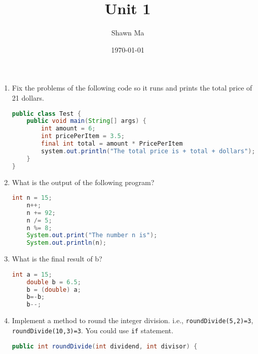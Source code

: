 \documentclass[letterpaper,12pt]{article}
\author{Shawn Ma}
\date{\today}
\title{Unit 1}
\begin{document}
\begin{enumerate}

    \item Fix the problems of the following code so it runs and prints the total 
    price of 21 dollars.
    \begin{lstlisting}[language=Java]
public class Test {
    public void main(String[] args) {
        int amount = 6;
        int pricePerItem = 3.5;
        final int total = amount * PricePerItem
        system.out.println("The total price is + total + dollars");
    }
}
    \end{lstlisting}

    \item What is the output of the following program? %
    \begin{lstlisting}[language=Java]
    int n = 15;
    n++;
    n += 92;
    n /= 5;
    n %= 8;
    System.out.print("The number n is");
    System.out.println(n);
    \end{lstlisting}

    \item What is the final result of b? %
    \begin{lstlisting}[language=Java]
    int a = 15;
    double b = 6.5;
    b = (double) a;
    b=-b;
    b--;
    \end{lstlisting}

    \item Implement a method to round the integer division. i.e., \verb|roundDivide(5,2)=3|,
     \verb|roundDivide(10,3)=3|. You could use \verb|if| statement.
    \begin{lstlisting}[language=Java]
public int roundDivide(int dividend, int divisor) {
        \end{lstlisting}
\vspace{2in}
\end{enumerate}
\end{document}
